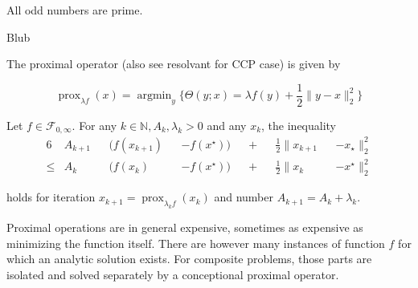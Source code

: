 \documentclass[varwidth=15cm, border=.5cm]{standalone}
\DeclareMathOperator{\prox}{prox}
\DeclareMathOperator{\argmin}{argmin}
\begin{document}
\begin{theorem}[label=pb8y7i3e, name=Boundedness of operators]
	All odd numbers are prime. 

	\begin{theorem}
		Blub
	\end{theorem}
\end{theorem}

\begin{definition}[label=f6izn8iw, name=Proximal Operator]
	The proximal operator (also see resolvant for CCP case) is given by 

	\[
        \prox_{\lambda f}(x) = \argmin_y \{ \Theta(y; x) = \lambda f(y) +
        \frac{1}{2}\lVert y - x\rVert_2^2\}
	\]

    \begin{theorem}[label=78req5r7, name=Convergence with Lyapunov Analysis]
        Let \( f\in\mathcal{F}_{0,\infty} \). For any \( k\in\mathbb{N}, A_k, \lambda_k > 0\) and any \( x_k \), the inequality
        \begin{alignat*}{6}
            &A_{k+1}&&(f(x_{k+1}) &&- f(x^\star)) &&+ &&\frac{1}{2}\lVert x_{k+1} &&- x_\star\rVert^2_2  \\
            \leq &A_k&&(f(x_k)   &&- f(x^\star)) &&+ &&\frac{1}{2}\lVert x_k   &&- x^\star\rVert_2^2
        \end{alignat*}

        holds for iteration \( x_{k+1} = \prox_{\lambda_kf}(x_k) \) and number \(A_{k+1}= A_k + \lambda_k\).
    \end{theorem}

    \begin{remark}[label=hnns6j86, name=Computation complexity]
        Proximal operations are in general expensive, sometimes as expensive as
        minimizing the function itself. There are however many instances of
        function \( f \) for which an analytic solution exists. For composite
        problems, those parts are isolated and solved separately by a
        conceptional proximal operator.
    \end{remark}
\end{definition}
\end{document}
